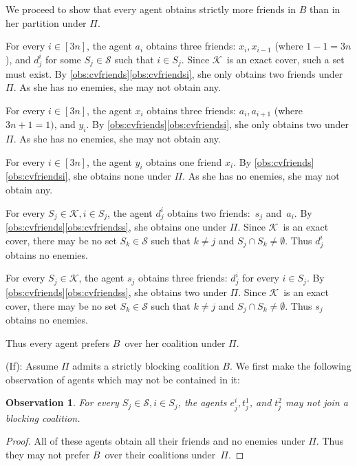 \documentclass[a4paper,fleqn]{cas-sc}
\newcommand{\partition}{\ensuremath{\Pi}\xspace}
\newcommand{\blockingCoalition}{\ensuremath{B}\xspace}
\newtheorem{obs}{Observation}
\newcommand{\sets}{\ensuremath{\mathcal{S}}}
\newcommand{\elements}{\ensuremath{[3n]}}
\newcommand{\sset}[1]{\ensuremath{S_{#1}}}
\newcommand{\ecov}{\ensuremath{\mathcal{K}}}
\begin{document}
{We proceed to show that every agent obtains strictly more friends in $\blockingCoalition$ than in her partition under \partition.
\begin{compactitem}
\item For every $i \in \elements$, the agent $a_i$ obtains three friends: $x_i, x_{i - 1}$ (where $1 - 1 = 3n$), and $d^i_j$ for some $\sset j \in \sets$ such that $i \in \sset j$. Since \ecov\ is an exact cover, such a set must exist. By \cref{obs:cvfriends}\eqref{obs:cvfriendsi}, she only obtains two friends under~\partition. As she has no enemies, she may not obtain any.
\item For every $i \in \elements$, the agent $x_i$ obtains three friends: $a_i, a_{i + 1}$ (where $3n + 1 = 1)$, and $y_i$. 
By \cref{obs:cvfriends}\eqref{obs:cvfriendsi}, she only obtains two under \partition. As she has no enemies, she may not obtain any.
\item For every $i \in \elements$, the agent $y_i$ obtains one friend $x_i$.
By \cref{obs:cvfriends}\eqref{obs:cvfriendsi}, she obtains none under \partition. 
As she has no enemies, she may not obtain any.
\item For every $\sset j \in \ecov, i \in \sset j$, the agent $d^i_j$ obtains two friends:~$s_j$ and~$a_i$. 
By \cref{obs:cvfriends}\eqref{obs:cvfriendss}, she obtains one under \partition. 
Since \ecov\ is an exact cover, there may be no set $\sset k \in \sets$ such that $k \neq j$ and $\sset j \cap \sset k \neq \emptyset$.
Thus $d^i_j$ obtains no enemies.
\item For every $\sset j \in \ecov$, the agent $s_j$ obtains three friends: $d^i_j$ for every $i \in \sset j$. 
By \cref{obs:cvfriends}\eqref{obs:cvfriendss}, she obtains two under \partition. 
Since \ecov\ is an exact cover, there may be no set $\sset k \in \sets$ such that $k \neq j$ and $\sset j \cap \sset k \neq \emptyset$.
Thus $s_j$ obtains no enemies.
\end{compactitem}
Thus every agent prefers \blockingCoalition\ over her coalition under \partition.

(If): Assume $\partition$ admits a strictly blocking coalition \blockingCoalition. 
We first make the following observation of agents which may not be contained in it:
\begin{obs}\label{obs:cvcantimpr}
For every $\sset j \in \sets, i \in \sset j$, the agents $e^i_j, t^1_j$, and $t^2_j$ may not join a blocking coalition.
\end{obs}
\begin{proof}\renewcommand{\qedsymbol}{$\diamond$}
All of these agents obtain all their friends and no enemies under \partition. Thus they may not prefer \blockingCoalition\ over their coalitions under~\partition.
\end{proof}

}
\end{document}
